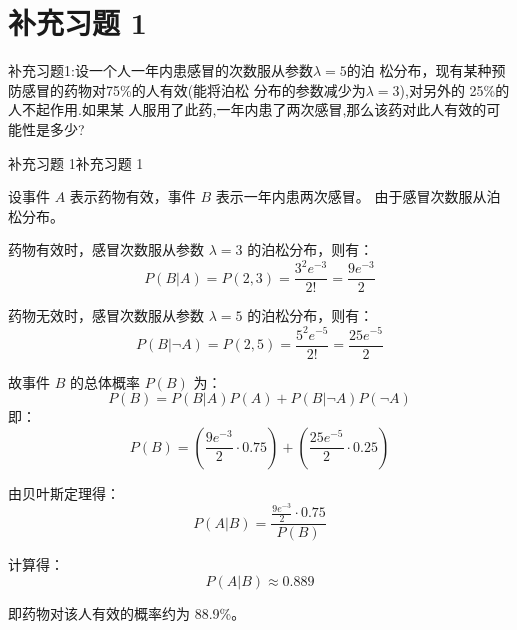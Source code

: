 \documentclass[twoside]{article}
\begin{document}
\section{补充习题 1}

补充习题1:设一个人一年内患感冒的次数服从参数\( \lambda =5 \)的泊
松分布，现有某种预防感冒的药物对75\%的人有效(能将泊松
分布的参数减少为\( \lambda =3 \)),对另外的 25\%的人不起作用.如果某
人服用了此药,一年内患了两次感冒,那么该药对此人有效的可
能性是多少?

\begin{ans}{补充习题 1}{补充习题 1}

设事件 $A$ 表示药物有效，事件 $B$ 表示一年内患两次感冒。
由于感冒次数服从泊松分布。

药物有效时，感冒次数服从参数 $\lambda = 3$ 的泊松分布，则有：
\[
P(B|A) = P(2, 3) = \frac{3^2 e^{-3}}{2!} = \frac{9 e^{-3}}{2}
\]

药物无效时，感冒次数服从参数 $\lambda = 5$ 的泊松分布，则有：
\[
P(B|\neg A) = P(2, 5) = \frac{5^2 e^{-5}}{2!} = \frac{25 e^{-5}}{2}
\]

故事件 $B$ 的总体概率 $P(B)$ 为：
\[
P(B) = P(B|A) P(A) + P(B|\neg A) P(\neg A)
\]
即：
\[
P(B) = \left(\frac{9 e^{-3}}{2} \cdot 0.75\right) + \left(\frac{25 e^{-5}}{2} \cdot 0.25\right)
\]

由贝叶斯定理得：
\[
P(A|B) = \frac{\frac{9 e^{-3}}{2} \cdot 0.75}{P(B)}
\]

计算得：
\[
P(A|B) \approx 0.889
\]

即药物对该人有效的概率约为 88.9\%。

\end{ans}
\end{document}
